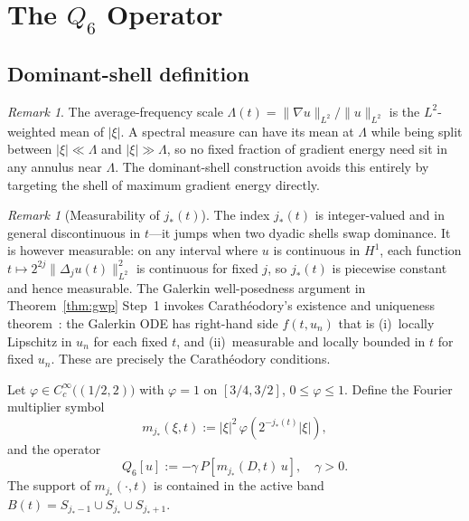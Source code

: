 \documentclass[12pt]{amsart}
\theoremstyle{remark}
\newtheorem{remark}[theorem]{Remark}
\newcommand{\Qsix}{Q_6}
\begin{document}
\section{The $Q_6$ Operator}
\label{sec:Q6}

\subsection{Dominant-shell definition}

\begin{remark}
The average-frequency scale $\Lambda(t)=\|\nabla u\|_{L^2}/\|u\|_{L^2}$
is the $L^2$-weighted mean of $|\xi|$.  A spectral measure can have its
mean at $\Lambda$ while being split between $|\xi|\ll\Lambda$ and
$|\xi|\gg\Lambda$, so no fixed fraction of gradient energy need sit in
any annulus near $\Lambda$.  The dominant-shell construction avoids this
entirely by targeting the shell of maximum gradient energy directly.
\end{remark}

\begin{remark}[Measurability of $j_*(t)$]
The index $j_*(t)$ is integer-valued and in general discontinuous in
$t$---it jumps when two dyadic shells swap dominance.  It is however
measurable: on any interval where $u$ is continuous in $H^1$, each
function $t\mapsto 2^{2j}\|\Delta_j u(t)\|_{L^2}^2$ is continuous for
fixed $j$, so $j_*(t)$ is piecewise constant and hence measurable.
The Galerkin well-posedness argument in Theorem~\ref{thm:gwp} Step~1
invokes Carath\'eodory's existence and uniqueness theorem~\cite{Hartman}:
the Galerkin ODE has right-hand side $f(t,u_n)$ that is (i)~locally
Lipschitz in $u_n$ for each fixed $t$, and (ii)~measurable and locally
bounded in $t$ for fixed $u_n$.  These are precisely the Carath\'eodory
conditions.
\end{remark}

Let $\varphi\in C^\infty_c\bigl((1/2,2)\bigr)$ with $\varphi=1$ on
$[3/4,3/2]$, $0\le\varphi\le 1$.  Define the Fourier multiplier symbol
\begin{equation}\label{eq:symbol}
  m_{j_*}(\xi,t):=|\xi|^2\,\varphi\!\left(2^{-j_*(t)}|\xi|\right),
\end{equation}
and the operator
\begin{equation}\label{eq:Q6}
  \Qsix[u]:=-\gamma\,P\!\left[m_{j_*}(D,t)\,u\right],\quad\gamma>0.
\end{equation}
The support of $m_{j_*}(\cdot,t)$ is contained in the active band
$B(t)=S_{j_*-1}\cup S_{j_*}\cup S_{j_*+1}$.
\end{document}
